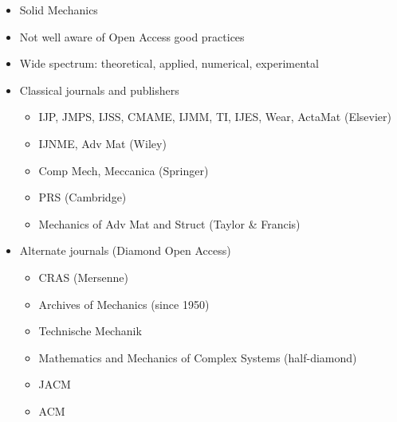 \documentclass[10pt,compress,serif,aspectratio=169]{beamer}
\begin{document}
\begin{frame}[t]
\vskip0.6cm
\begin{itemize}
 \item Solid Mechanics
 \item Not well aware of Open Access good practices
 \item Wide spectrum: theoretical, applied, numerical, experimental
 \item Classical journals and publishers
 \begin{itemize}
 \item IJP, JMPS, IJSS, CMAME, IJMM, TI, IJES, Wear, ActaMat (Elsevier)
 \item IJNME, Adv Mat (Wiley)
 \item Comp Mech, Meccanica (Springer)
 \item PRS (Cambridge)
 \item Mechanics of Adv Mat and Struct (Taylor \& Francis)
 \end{itemize}
 \item Alternate journals (Diamond Open Access)
  \begin{itemize}
 \item CRAS (Mersenne)
 \item Archives of Mechanics (since 1950)
 \item Technische Mechanik
 \item Mathematics and Mechanics of Complex Systems (half-diamond)
 \item JACM
 \item ACM
 \end{itemize}
\end{itemize}

\end{frame}

\end{document}
